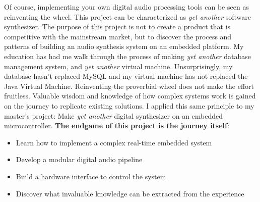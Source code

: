 \documentclass[acmlarge,screen]{acmart}
\begin{document}
	Of course, implementing your own digital audio processing tools can be seen as reinventing the wheel. This project can be characterized as \textit{yet another} software synthesizer. The purpose of this project is not to create a product that is competitive with the mainstream market, but to discover the process and patterns of building an audio synthesis system on an embedded platform. My education has had me walk through the process of making \textit{yet another} database management system, and \textit{yet another} virtual machine. Unsurprisingly, my database hasn't replaced MySQL and my virtual machine has not replaced the Java Virtual Machine. Reinventing the proverbial wheel does not make the effort fruitless. Valuable wisdom and knowledge of how complex systems work is gained on the journey to replicate existing solutions. I applied this same principle to my master's project: Make \textit{yet another} digital synthesizer on an embedded microcontroller. \textbf{The endgame of this project is the journey itself}:
	\begin{itemize}
		\item Learn how to implement a complex real-time embedded system
		\item Develop a modular digital audio pipeline
		\item Build a hardware interface to control the system
		\item Discover what invaluable knowledge can be extracted from the experience
	\end{itemize}
	
\end{document}
